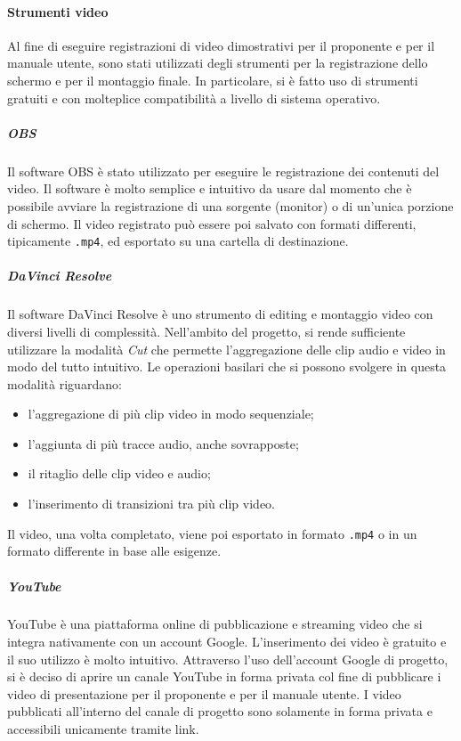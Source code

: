 	\paragraph{Strumenti video}

	Al fine di eseguire registrazioni di video dimostrativi per il proponente e per il manuale utente, sono stati utilizzati degli strumenti per la registrazione dello schermo e per il montaggio finale. In particolare, si è fatto uso di strumenti gratuiti e con molteplice compatibilità a livello di sistema operativo.

		\subparagraph{OBS}

		Il software OBS è stato utilizzato per eseguire le registrazione dei contenuti del video.
		\newline
		Il software è molto semplice e intuitivo da usare dal momento che è possibile avviare la registrazione di una sorgente (monitor) o di un'unica porzione di schermo.
		\newline
		Il video registrato può essere poi salvato con formati differenti, tipicamente \verb!.mp4!, ed esportato su una cartella di destinazione. 

		\subparagraph{DaVinci Resolve}

		Il software DaVinci Resolve è uno strumento di editing e montaggio video con diversi livelli di complessità.
		\newline
		Nell'ambito del progetto, si rende sufficiente utilizzare la modalità \textit{Cut} che permette l'aggregazione delle clip audio e video in modo del tutto intuitivo.
		\newline
		Le operazioni basilari che si possono svolgere in questa modalità riguardano:
		\begin{itemize}
			\item l'aggregazione di più clip video in modo sequenziale;
			\item l'aggiunta di più tracce audio, anche sovrapposte;
			\item il ritaglio delle clip video e audio;
			\item l'inserimento di transizioni tra più clip video.
		\end{itemize}
		Il video, una volta completato, viene poi esportato in formato \verb!.mp4! o in un formato differente in base alle esigenze.

		\subparagraph{YouTube}

		YouTube è una piattaforma online di pubblicazione e streaming video che si integra nativamente con un account Google. L'inserimento dei video è gratuito e il suo utilizzo è molto intuitivo.
		\newline
		Attraverso l'uso dell'account Google di progetto, si è deciso di aprire un canale YouTube in forma privata col fine di pubblicare i video di presentazione per il proponente e per il manuale utente.
		\newline
		I video pubblicati all'interno del canale di progetto sono solamente in forma privata e accessibili unicamente tramite link.
  

